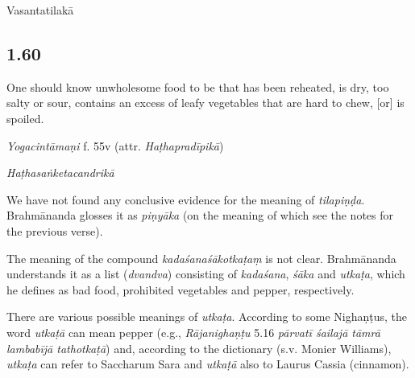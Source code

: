 \begin{ekdosis}
\begin{metre}[hp01_059]
Vasantatilakā 
\end{metre}

\subsection*{1.60}
\begin{translation}[hp01_060]
One should know unwholesome food to be that has been reheated, is dry, too salty or sour, contains an excess of leafy vegetables that are hard to chew, [or] is spoiled.
\end{translation}


\begin{testimonia}[hp01_060]
\emph{Yogacintāmaṇi} f. 55v (attr. \emph{Haṭhapradīpikā})

\begin{versinnote}
\end{versinnote}

\emph{Haṭhasaṅketacandrikā}

\begin{versinnote}
\end{versinnote}

\end{testimonia}

\begin{philcomm}[hp01_060]
We have not found any conclusive evidence for the meaning of \emph{tilapiṇḍa}. Brahmānanda glosses it as \emph{piṇyāka} (on the meaning of which see the notes for the previous verse).

The meaning of the compound \emph{kadaśanaśākotkaṭaṃ} is not clear. Brahmānanda understands it as a list (\emph{dvandva}) consisting of \emph{kadaśana}, \emph{śāka} and \emph{utkaṭa}, which he defines as bad food, prohibited vegetables and pepper, respectively.

There are various possible meanings of \emph{utkaṭa}. According to some Nighaṇṭus, the word \emph{utkaṭā} can mean pepper  (e.g., \emph{Rājanighaṇṭu} 5.16 \emph{pārvatī śailajā tāmrā lambabījā tathotkaṭā}) and, according to the dictionary (s.v. Monier Williams), \emph{utkaṭa} can refer to Saccharum Sara and \emph{utkaṭā} also to Laurus Cassia (cinnamon). 


\end{philcomm}
\end{ekdosis}
